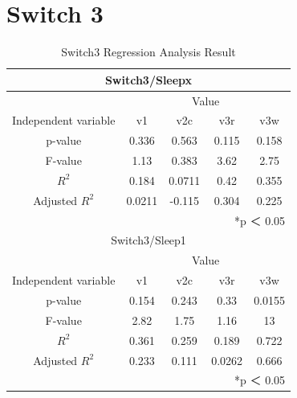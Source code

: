 \documentclass[11pt
  , a4paper
  , article
  , oneside
]{memoir}
\begin{document}
\section{Switch 3}
\begin{table}[h!]
\begin{center}
\begin{tabular}{c|c||c||c||c}
\multicolumn{5}{c}{Switch3/Sleepx}\\ \hline\hline
\multicolumn{1}{c|}{}& \multicolumn{4}{c}{Value}\\
\cline{1-5}
Independent variable & v1 & v2c & v3r & v3w      \\ \hline\hline
p-value & 0.336 & 0.563 & 0.115 & 0.158\\ 
F-value & 1.13  & 0.383 & 3.62 & 2.75\\ 
$  R^2  $ & 0.184 & 0.0711 & 0.42 & 0.355\\ 
Adjusted $  R^2  $ & 0.0211 & -0.115 & 0.304 & 0.225\\ \hline\hline
\multicolumn{5}{r}{*p ＜ 0.05} \\ 
\multicolumn{5}{c}{Switch3/Sleep1}\\ \hline\hline
\multicolumn{1}{c|}{}& \multicolumn{4}{c}{Value}\\
\cline{1-5}
Independent variable & v1 & v2c & v3r & v3w      \\ \hline\hline
p-value & 0.154 & 0.243 & 0.33 & 0.0155\\ 
F-value & 2.82 & 1.75 & 1.16 & 13\\ 
$  R^2  $ & 0.361 & 0.259 & 0.189 & 0.722\\ 
Adjusted $  R^2  $ & 0.233  & 0.111& 0.0262 & 0.666\\ \hline\hline
\multicolumn{5}{r}{*p ＜ 0.05} \\ 
\end{tabular}
\caption{Switch3 Regression Analysis Result }
\end{center}
\end{table} 
\clearpage
\end{document}
